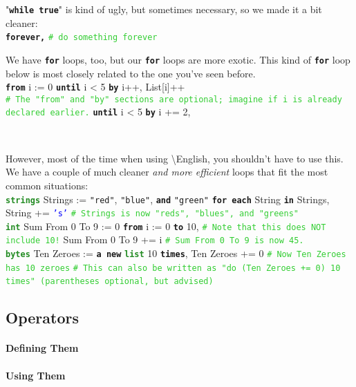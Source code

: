 \documentclass{article}
\newcommand{\English}{\textbackslash{}English}				%
\newcommand{\ssecl}[1]{\subsection{#1}\label{ssec:#1}}
\newcommand{\codecomment}[1]{\texttt{\textcolor{LimeGreen}{#1}}}
\newcommand{\commentline}[1]{\codecomment{\# #1}}
\newcommand{\type}[1]{\texttt{\textcolor{ForestGreen}{\textbf{#1}}}}
\newcommand{\common}[1]{\texttt{\textcolor{Mulberry}{\textbf{#1}}}}
\newcommand{\codestring}[1]{\texttt{\textcolor{NavyBlue}{"#1"}}}
\newcommand{\codechar}[1]{\texttt{\textcolor{Blue}{#1}}}
\newenvironment{code}[0]
{\ttfamily{}				%
\setlength\parindent{0cm}	%
~\\}
{\setlength\parindent{1cm}
~\\}
\begin{document}
\indent "\common{while true}" is kind of ugly, but sometimes necessary, so we made it a bit cleaner:
\begin{code}
\common{forever,}
\qquad{}\commentline{do something forever}
\end{code}

\indent We have \common{for} loops, too, but our \common{for} loops are more exotic. This kind of \common{for} loop below is most closely related to the one you've seen before.
\begin{code}
\common{from} i := 0 \common{until} i < 5 \common{by} i++,
\qquad{}List[i]++\\

\commentline{The "from" and "by" sections are optional; imagine if i is already declared earlier.}
\common{until} i < 5 \common{by} i += 2,
	
\end{code}

\indent However, most of the time when using \English{}, you shouldn't have to use this. We have a couple of much cleaner \emph{and more efficient} loops that fit the most common situations:
\begin{code}
\type{strings} Strings := \codestring{red}, \codestring{blue}, \common{and} \codestring{green}
\common{for each} String \common{in} Strings,
\qquad{}String += \codechar{'s'}
\commentline{Strings is now "reds", "blues", and "greens"}\\

\type{int} Sum From 0 To 9 := 0
\common{from} i := 0 \common{to} 10, \commentline{Note that this does NOT include 10!}
\qquad{}Sum From 0 To 9 += i
\commentline{Sum From 0 To 9 is now 45.}\\

\type{bytes} Ten Zeroes := \common{a new} \type{list}
10 \common{times},
\qquad{}Ten Zeroes += 0
\commentline{Now Ten Zeroes has 10 zeroes}
\commentline{This can also be written as "do (Ten Zeroes += 0) 10 times" (parentheses optional, but advised)}
\end{code}

\ssecl{Operators}
\paragraph{Defining Them}

\paragraph{Using Them}
\end{document}
